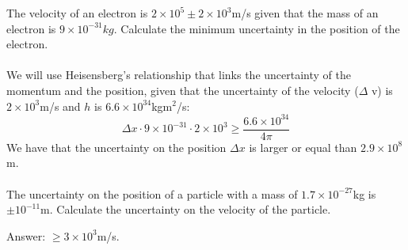 \documentclass[main.tex]{subfiles}
\begin{document}
\begin{description}
\begin{example} %
The velocity of an electron is $2\times 10^{5} \pm 2\times 10^{3}$m/s given that the mass of an electron is $9\times 10^{-31}kg$. Calculate the minimum uncertainty in the position of the electron.\\
\\
We will use Heisensberg's relationship that links the uncertainty of the momentum and the position, given that the uncertainty of the velocity ($\Delta$ v) is $2\times 10^{3}$m/s and $h$ is $6.6\times 10^{34}$kgm$^2$/s:
\[
\Delta x\cdot 9\times 10^{-31}\cdot  2\times 10^3 \geq \frac{6.6\times 10^{34}}{4\pi} 
\]
We have that the uncertainty on the position $\Delta x$ is larger or equal than $2.9\times 10^{8}$m.\\
\faDiamond\ \\
The uncertainty on the position of a particle with a mass of $1.7 \times 10^{-27}$kg is $\pm 10^{-11}$m. Calculate the uncertainty on the velocity of the particle.

\flushright Answer: $\geq 3\times 10^{3}$m/s. 
\end{example}%
\end{description}

\newpage
\end{document}
